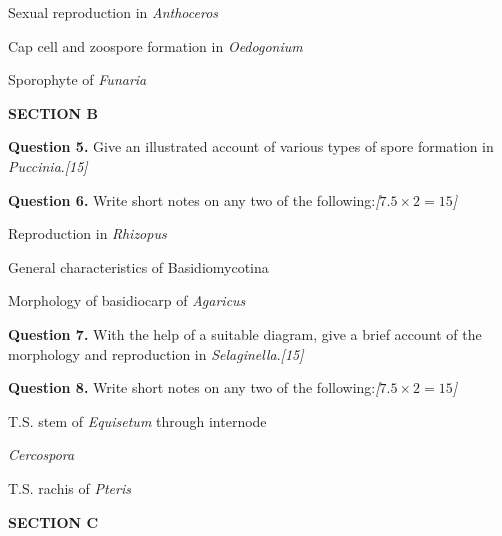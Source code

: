 \documentclass[11pt,a4paper]{article}
\newcommand{\pts}[1]{\hfill   \textit{[#1]}}
\begin{document}
\begin{parts}
  \item Sexual reproduction in   \textit{Anthoceros}
  \item Cap cell and zoospore formation in   \textit{Oedogonium}
  \item Sporophyte of   \textit{Funaria}
\end{parts}

\bigskip

\begin{center}
   \textbf{SECTION B}
\end{center}
\medskip

\medskip


\noindent   \textbf{Question 5.} Give an illustrated account of various types of spore formation in   \textit{Puccinia}.\pts{15}

\medskip


\noindent   \textbf{Question 6.} Write short notes on any two of the following:\pts{$7.5  \times 2 = 15$}

\begin{parts}
  \item Reproduction in   \textit{Rhizopus}
  \item General characteristics of Basidiomycotina
  \item Morphology of basidiocarp of   \textit{Agaricus}
\end{parts}

\medskip


\noindent   \textbf{Question 7.} With the help of a suitable diagram, give a brief account of the morphology and reproduction in   \textit{Selaginella}.\pts{15}

\medskip


\noindent   \textbf{Question 8.} Write short notes on any two of the following:\pts{$7.5  \times 2 = 15$}

\begin{parts}
  \item T.S. stem of   \textit{Equisetum} through internode
  \item   \textit{Cercospora}
  \item T.S. rachis of   \textit{Pteris}
\end{parts}

\bigskip

\begin{center}
   \textbf{SECTION C}
\end{center}
\medskip

\medskip
\end{document}
